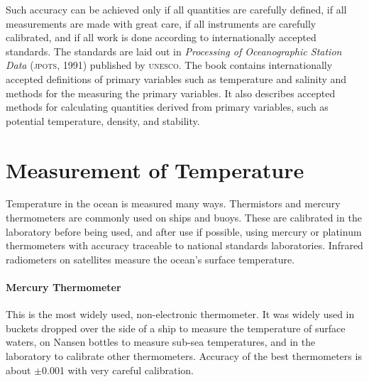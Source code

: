 Such accuracy can be achieved only if all quantities are carefully
defined, if all measurements are made with great care, if all
instruments are carefully calibrated, and if all work is done
according to internationally accepted standards. The standards are
laid out in \textit{Processing of Oceanographic Station
  Data}
(\textsc{jpots}, 1991) published by \textsc{unesco}. The book contains
internationally accepted definitions of primary variables such as
temperature and salinity and methods for the measuring the primary
variables. It also describes accepted methods for calculating
quantities derived from primary variables, such as potential
temperature, density, and stability.

\section{Measurement of Temperature}
Temperature in the ocean is
measured many ways. Thermistors and mercury thermometers are commonly
used on ships and buoys. These are calibrated in the laboratory before
being used, and after use if possible, using mercury or platinum
thermometers with accuracy
traceable to national standards laboratories. Infrared radiometers on
satellites measure the ocean's surface temperature.

\paragraph{Mercury Thermometer} This is the most widely used,
non-electronic
thermometer. It was widely used in buckets dropped over the side of a
ship to measure the temperature of surface waters, on Nansen bottles
to measure sub-sea temperatures, and in the laboratory to calibrate
other thermometers. Accuracy of
the best thermometers is about $\pm$0.001 with very careful
calibration.

